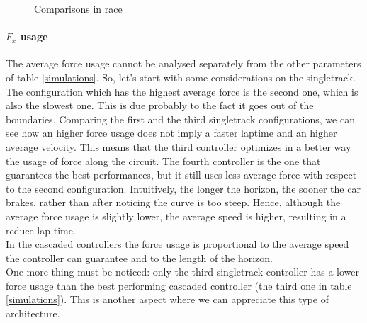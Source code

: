 \documentclass[a4paper, onecolumn, 12pt]{article}
\begin{document}
\begin{figure}[H]
\begin{subfigure}{0.8\textwidth}
        \label{race5}
    \end{subfigure}
    \caption[short]{Comparisons in race}
    \label{race_ippodromo}
\end{figure}

\paragraph{$F_x$ usage } \label{force_usage} The average force usage cannot be
analysed separately from the other parameters of table \ref{simulations}. So,
let's start with some considerations on the singletrack. The configuration which
has the highest average force is the second one, which is also the slowest one.
This is due probably to the fact it goes out of the boundaries. Comparing the
first and the third singletrack configurations, we can see how an higher force
usage does not imply a faster laptime and an higher average velocity. This means
that the third controller optimizes in a better way the usage of force along the
circuit. The fourth controller is the one that guarantees the best performances,
but it still uses less average force with respect to the second configuration.
Intuitively, the longer the horizon, the sooner the car brakes, rather than
after noticing the curve is too steep. Hence, although the average force usage
is slightly lower, the average speed is higher, resulting in a reduce lap
time.\\
In the cascaded controllers the force usage is proportional to the average speed
the controller can guarantee and to the length of the horizon. \\
One more thing must be noticed: only the third singletrack controller has a lower force usage
than the best performing cascaded controller (the third one in table \ref{simulations}).
This is another aspect where we can appreciate this type of architecture.
\end{document}
